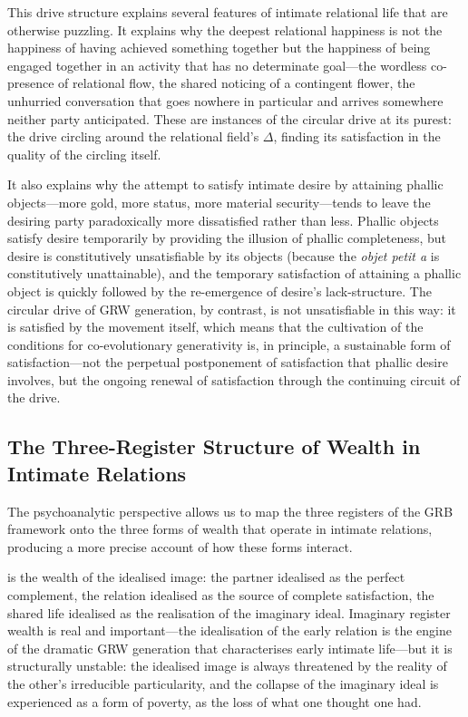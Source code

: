 This drive structure explains several features of intimate relational life that are otherwise puzzling. It explains why the deepest relational happiness is not the happiness of having achieved something together but the happiness of being engaged together in an activity that has no determinate goal---the wordless co-presence of relational flow, the shared noticing of a contingent flower, the unhurried conversation that goes nowhere in particular and arrives somewhere neither party anticipated. These are instances of the circular drive at its purest: the drive circling around the relational field's $\Delta$, finding its satisfaction in the quality of the circling itself.

It also explains why the attempt to satisfy intimate desire by attaining phallic objects---more gold, more status, more material security---tends to leave the desiring party paradoxically more dissatisfied rather than less. Phallic objects satisfy desire temporarily by providing the illusion of phallic completeness, but desire is constitutively unsatisfiable by its objects (because the \emph{objet petit a} is constitutively unattainable), and the temporary satisfaction of attaining a phallic object is quickly followed by the re-emergence of desire's lack-structure. The circular drive of GRW generation, by contrast, is not unsatisfiable in this way: it is satisfied by the movement itself, which means that the cultivation of the conditions for co-evolutionary generativity is, in principle, a sustainable form of satisfaction---not the perpetual postponement of satisfaction that phallic desire involves, but the ongoing renewal of satisfaction through the continuing circuit of the drive.

\subsection{The Three-Register Structure of Wealth in Intimate Relations}
\label{p15:subsec:threeregisters}

\noindent
The psychoanalytic perspective allows us to map the three registers of the GRB framework onto the three forms of wealth that operate in intimate relations, producing a more precise account of how these forms interact.

 is the wealth of the idealised image: the partner idealised as the perfect complement, the relation idealised as the source of complete satisfaction, the shared life idealised as the realisation of the imaginary ideal. Imaginary register wealth is real and important---the idealisation of the early relation is the engine of the dramatic GRW generation that characterises early intimate life---but it is structurally unstable: the idealised image is always threatened by the reality of the other's irreducible particularity, and the collapse of the imaginary ideal is experienced as a form of poverty, as the loss of what one thought one had.


